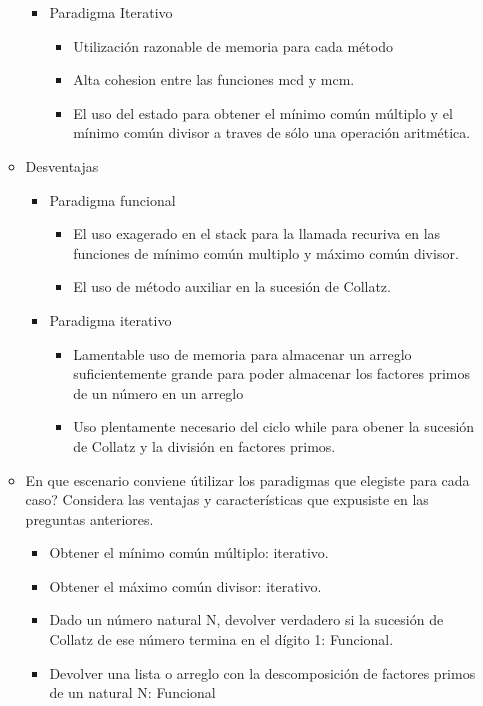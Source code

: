 \documentclass[10pt]{article}
\begin{document}
\begin{titlepage}
\begin{flushleft}
\begin{itemize}
\begin{itemize}
\begin{itemize}
						\item Paradigma Iterativo
						\begin{itemize}
							\item Utilización razonable de memoria para cada método
							\item Alta cohesion entre las funciones mcd y mcm.
							\item El uso del estado para obtener el mínimo común múltiplo y el mínimo común divisor a traves de sólo una operación aritmética.
						\end{itemize}

					\end{itemize}

				\item Desventajas
					\begin{itemize}
						
						\item Paradigma funcional
							\begin{itemize}
								\item El uso exagerado en el stack para la llamada recuriva en las funciones de mínimo común multiplo y máximo común divisor.
								\item El uso de método auxiliar en la sucesión de Collatz.
							\end{itemize}

						\item Paradigma iterativo
						\begin{itemize}
							\item Lamentable uso de memoria para almacenar un arreglo suficientemente grande para poder almacenar los factores primos de un número en un arreglo
							\item Uso plentamente necesario del ciclo while para obener la sucesión de Collatz y la división en factores primos.
						\end{itemize}
					\end{itemize}

				\item En que escenario conviene útilizar los paradigmas que elegiste para cada caso? Considera las ventajas y características que expusiste en las preguntas anteriores.
				\begin{itemize}

					\item Obtener el mínimo común múltiplo: iterativo.
					\item Obtener el máximo común divisor: iterativo.
					\item Dado un número natural N, devolver verdadero si la sucesión de Collatz de ese número termina en el dígito 1: Funcional.
					\item Devolver una lista o arreglo con la descomposición de factores primos de un natural N: Funcional
				\end{itemize}
			\end{itemize}


\end{itemize}
\end{flushleft}
\end{titlepage}
\end{document}
